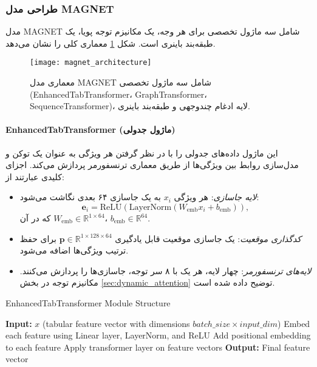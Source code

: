 \subsubsection{طراحی مدل MAGNET}
مدل MAGNET شامل سه ماژول تخصصی برای هر وجه، یک مکانیزم توجه پویا، یک طبقه‌بند باینری است. شکل \ref{fig:magnet_architecture} معماری کلی را نشان می‌دهد.

\begin{figure}[ht]
	\centering
    \texttt{[image: magnet\_architecture]}
    \caption{معماری مدل MAGNET شامل سه ماژول تخصصی (EnhancedTabTransformer، GraphTransformer، SequenceTransformer)، لایه ادغام چندوجهی و طبقه‌بند باینری.}
    \label{fig:magnet_architecture}
\end{figure}

\paragraph{EnhancedTabTransformer (ماژول جدولی)}
این ماژول داده‌های جدولی را با در نظر گرفتن هر ویژگی به عنوان یک توکن و مدل‌سازی روابط بین ویژگی‌ها از طریق معماری ترنسفورمر پردازش می‌کند. اجزای کلیدی عبارتند از:
\begin{itemize}
    \item \textit{لایه جاسازی}: هر ویژگی \( x_i \) به یک جاسازی ۶۴ بعدی نگاشت می‌شود:
    \[
    \mathbf{e}_i = \text{ReLU}(\text{LayerNorm}(W_{\text{emb}} x_i + b_{\text{emb}})),
    \]
    که در آن \( W_{\text{emb}} \in \mathbb{R}^{1 \times 64} \)، \( b_{\text{emb}} \in \mathbb{R}^{64} \).
    \item \textit{کدگذاری موقعیت}: یک جاسازی موقعیت قابل یادگیری \( \mathbf{p} \in \mathbb{R}^{1 \times 128 \times 64} \) برای حفظ ترتیب ویژگی‌ها اضافه می‌شود.
    \item \textit{لایه‌های ترنسفورمر}: چهار لایه، هر یک با ۸ سر توجه، جاسازی‌ها را پردازش می‌کنند. مکانیزم توجه در بخش \ref{sec:dynamic_attention} توضیح داده شده است.
\end{itemize}
\begin{LTR}
\begin{algorithm}[h]
\caption{EnhancedTabTransformer Module Structure}
\begin{algorithmic}[1]
\STATE \textbf{Input:} $x$ (tabular feature vector with dimensions $batch\_size \times input\_dim$)
\STATE Embed each feature using Linear layer, LayerNorm, and ReLU
\STATE Add positional embedding to each feature
    \STATE Apply transformer layer on feature vectors
\ENDFOR
\STATE \textbf{Output:} Final feature vector
\end{algorithmic}
\end{algorithm}
\end{LTR}

